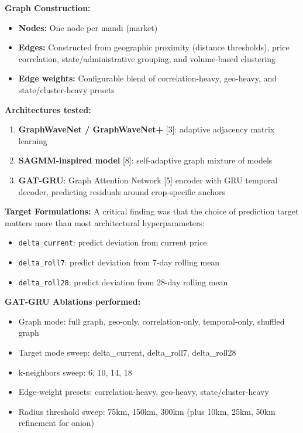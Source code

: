 \documentclass[12pt,a4paper]{article}
\begin{document}
\noindent\textbf{Graph Construction:}

\begin{itemize}
\item \textbf{Nodes:} One node per mandi (market)
\item \textbf{Edges:} Constructed from geographic proximity (distance thresholds), price correlation, state/administrative grouping, and volume-based clustering
\item \textbf{Edge weights:} Configurable blend of correlation-heavy, geo-heavy, and state/cluster-heavy presets
\end{itemize}
\noindent\textbf{Architectures tested:}

\begin{enumerate}
\item \textbf{GraphWaveNet / GraphWaveNet+} [3]: adaptive adjacency matrix learning
\item \textbf{SAGMM-inspired model} [8]: self-adaptive graph mixture of models
\item \textbf{GAT-GRU}: Graph Attention Network [5] encoder with GRU temporal decoder, predicting residuals around crop-specific anchors
\end{enumerate}
\textbf{Target Formulations:} A critical finding was that the choice of prediction target matters more than most architectural hyperparameters:

\begin{itemize}
\item \texttt{delta_current}: predict deviation from current price
\item \texttt{delta_roll7}: predict deviation from 7-day rolling mean
\item \texttt{delta_roll28}: predict deviation from 28-day rolling mean
\end{itemize}
\noindent\textbf{GAT-GRU Ablations performed:}

\begin{itemize}
\item Graph mode: full graph, geo-only, correlation-only, temporal-only, shuffled graph
\item Target mode sweep: delta\_current, delta\_roll7, delta\_roll28
\item k-neighbors sweep: 6, 10, 14, 18
\item Edge-weight presets: correlation-heavy, geo-heavy, state/cluster-heavy
\item Radius threshold sweep: 75km, 150km, 300km (plus 10km, 25km, 50km refinement for onion)
\end{itemize}
\end{document}
